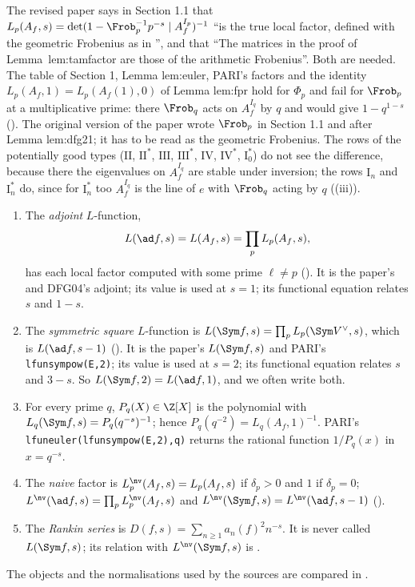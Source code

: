 \begin{warning}\label{warn:lfunctions:two-frobenii}
The revised paper says in Section 1.1 that $L_p(A_f,s)=\det(1-\Frob_p^{-1}p^{-s}\mid A_f^{I_p})^{-1}$ ``is the true local factor, defined with the geometric Frobenius as in
\cite[\S1.1.1]{DFG04}'', and that ``The matrices in the proof of Lemma~lem:tamfactor are those of the arithmetic Frobenius''. Both are needed. The table of
Section 1, Lemma lem:euler, PARI's factors and the identity $L_p(A_f,1)=L_p(A_f(1),0)$ of Lemma lem:fpr hold for $\Phi_p$ and fail for $\Frob_p$ at a
multiplicative prime: there $\Frob_q$ acts on $A_f^{I_q}$ by $q$ and would give $1-q^{1-s}$ (). The original version of the paper
wrote $\Frob_p$ in Section 1.1 and after Lemma lem:dfg21; it has to be read as the geometric Frobenius. The rows of the potentially good types
($\mathrm{II}$, $\mathrm{II}^*$, $\mathrm{III}$, $\mathrm{III}^*$, $\mathrm{IV}$, $\mathrm{IV}^*$, $\mathrm I_0^*$) do not see the difference, because there the eigenvalues on $A_f^{I_q}$
are stable under inversion; the rows $\mathrm I_n$ and $\mathrm I_n^*$ do, since for $\mathrm I_n^*$ too $A_f^{I_q}$ is the line of $e$ with $\Frob_q$ acting by $q$
((iii)).
\end{warning}

\begin{convention}\label{conv:lfunctions:normalisations}
\begin{enumerate}[label=(\alph*)]
\item The \emph{adjoint} $L$-function,
\[
L(\ad f,s)=L(A_f,s)=\prod_pL_p(A_f,s),
\]
has each local factor computed with some prime $\ell\ne p$ (). It is the paper's and DFG04's adjoint; its value is used at $s=1$; its functional equation relates $s$ and $1-s$.
\item The \emph{symmetric square} $L$-function is $L(\Sym f,s)=\prod_pL_p(\Sym V^\vee,s)$, which is $L(\ad f,s-1)$ (). It is the paper's $L(\Sym f,s)$ and
PARI's \texttt{lfunsympow(E,2)}; its value is used at $s=2$; its functional equation relates $s$ and $3-s$. So $L(\Sym f,2)=L(\ad f,1)$, and we often write both.
\item For every prime $q$, $P_q(X)\in\Z[X]$ is the polynomial with $L_q(\Sym f,s)=P_q(q^{-s})^{-1}$; hence $P_q(q^{-2})=L_q(A_f,1)^{-1}$. PARI's
\texttt{lfuneuler(lfunsympow(E,2),q)} returns the rational function $1/P_q(x)$ in $x=q^{-s}$.
\item The \emph{naive} factor is $L_p^{\nv}(A_f,s)=L_p(A_f,s)$ if $\delta_p>0$ and $1$ if $\delta_p=0$; $L^{\nv}(\ad f,s)=\prod_pL_p^{\nv}(A_f,s)$ and
$L^{\nv}(\Sym f,s)=L^{\nv}(\ad f,s-1)$ ().
\item The \emph{Rankin series} is $D(f,s)=\sum_{n\ge1}a_n(f)^2n^{-s}$. It is never called $L(\Sym f,s)$; its relation with $L^{\nv}(\Sym f,s)$ is
.
\end{enumerate}
The objects and the normalisations used by the sources are compared in .
\end{convention}

